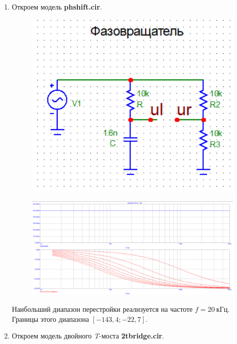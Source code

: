 \documentclass[a4paper, 12pt]{article}%
\begin{document}
\begin{enumerate}

\item Откроем модель \textbf{phshift.cir}.

\begin{figure}[h!]
\centering
\includegraphics[scale=0.4]{phshift_omg.png}
\label{fig:Image1}
\end{figure} 

\begin{figure}[h!]
\centering
\includegraphics[scale=0.4]{phshift.png}
\label{fig:Image1}
\end{figure}

Наибольший диапазон перестройки реализуется на частоте $f = 20  \: \textit{кГц}$. Границы этого диапазона $[-143,4; -22,7]$.

\item Откроем модель двойного \textit{T}-моста \textbf{2tbridge.cir}.


\end{enumerate}
\end{document}
